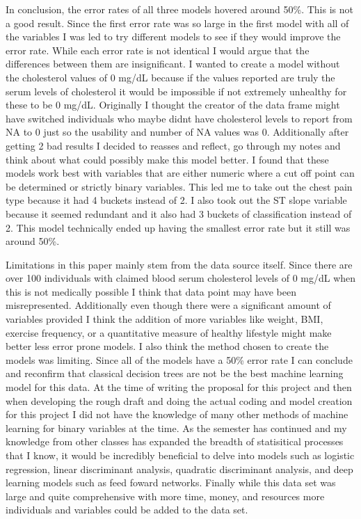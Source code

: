 \documentclass[12pt]{article}
\begin{document}
In conclusion, the error rates of all three models hovered around 50\%. This is not a good result. Since the first error rate was so large in the first model with all of the variables I was led to try different models to see if they would improve the error rate. While each error rate is not identical I would argue that the differences between them are insignificant. I wanted to create a model without the cholesterol values of 0 mg/dL because if the values reported are truly the serum levels of cholesterol it would be impossible if not extremely unhealthy for these to be 0 mg/dL. Originally I thought the creator of the data frame might have switched individuals who maybe didn\textsc{}t have cholesterol levels to report from NA to 0 just so the usability and number of NA values was 0. Additionally after getting 2 bad results I decided to reasses and reflect, go through my notes and think about what could possibly make this model better. I found that these models work best with variables that are either numeric where a cut off point can be determined or strictly binary variables. This led me to take out the chest pain type because it had 4 buckets instead of 2. I also took out the ST slope variable because it seemed redundant and it also had 3 buckets of classification instead of 2. This model technically ended up having the smallest error rate but it still was around 50\%. \par 
Limitations in this paper mainly stem from the data source itself. Since there are over 100 individuals with claimed blood serum cholesterol levels of 0 mg/dL when this is not medically possible I think that data point may have been misrepresented. Additionally even though there were a significant amount of variables provided I think the addition of more variables like weight, BMI, exercise frequency, or a quantitative measure of healthy lifestyle might make better less error prone models. I also think the method chosen to create the models was limiting. Since all of the models have a 50\% error rate I can conclude and reconfirm that classical decision trees are not be the best machine learning model for this data. At the time of writing the proposal for this project and then when developing the rough draft and doing the actual coding and model creation for this project I did not have the knowledge of many other methods of machine learning for binary variables at the time. As the semester has continued and my knowledge from other classes has expanded the breadth of statisitical processes that I know, it would be incredibly beneficial to delve into models such as logistic regression, linear discriminant analysis, quadratic discriminant analysis, and deep learning models such as feed foward networks. Finally while this data set was large and quite comprehensive with more time, money, and resources more individuals and variables could be added to the data set. \par
\end{document}
